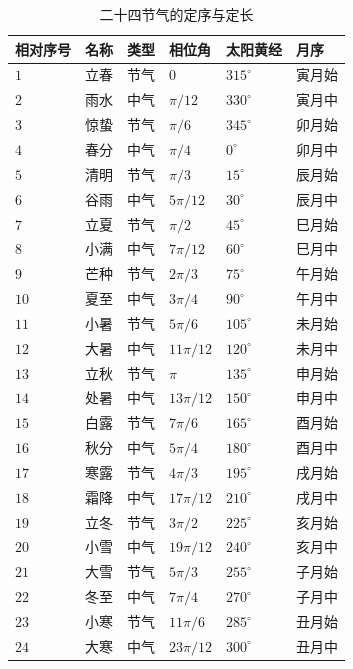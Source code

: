 \begin{table}[htbp]
    \centering
    \caption{二十四节气的定序与定长}
    \label{tab:jieqi_sequence}
    \begin{tabular}{>{\centering\arraybackslash}p{1.2cm}>{\centering\arraybackslash}p{1.5cm}>{\centering\arraybackslash}p{1.5cm}>{\centering\arraybackslash}p{1.8cm}>{\centering\arraybackslash}p{2cm}>{\centering\arraybackslash}p{2.5cm}}
        \toprule
        相对序号 & 名称 & 类型 & 相位角 & 太阳黄经 & 月序 \\
        \midrule
        \(1\) & 立春 & 节气 & \(0\) & \(315^\circ\) & 寅月始 \\
        \(2\) & 雨水 & 中气 & \(\pi/12\) & \(330^\circ\) & 寅月中 \\
        \(3\) & 惊蛰 & 节气 & \(\pi/6\) & \(345^\circ\) & 卯月始 \\
        \(4\) & 春分 & 中气 & \(\pi/4\) & \(0^\circ\) & 卯月中 \\
        \(5\) & 清明 & 节气 & \(\pi/3\) & \(15^\circ\) & 辰月始 \\
        \(6\) & 谷雨 & 中气 & \(5\pi/12\) & \(30^\circ\) & 辰月中 \\
        \(7\) & 立夏 & 节气 & \(\pi/2\) & \(45^\circ\) & 巳月始 \\
        \(8\) & 小满 & 中气 & \(7\pi/12\) & \(60^\circ\) & 巳月中 \\
        \(9\) & 芒种 & 节气 & \(2\pi/3\) & \(75^\circ\) & 午月始 \\
        \(10\) & 夏至 & 中气 & \(3\pi/4\) & \(90^\circ\) & 午月中 \\
        \(11\) & 小暑 & 节气 & \(5\pi/6\) & \(105^\circ\) & 未月始 \\
        \(12\) & 大暑 & 中气 & \(11\pi/12\) & \(120^\circ\) & 未月中 \\
        \(13\) & 立秋 & 节气 & \(\pi\) & \(135^\circ\) & 申月始 \\
        \(14\) & 处暑 & 中气 & \(13\pi/12\) & \(150^\circ\) & 申月中 \\
        \(15\) & 白露 & 节气 & \(7\pi/6\) & \(165^\circ\) & 酉月始 \\
        \(16\) & 秋分 & 中气 & \(5\pi/4\) & \(180^\circ\) & 酉月中 \\
        \(17\) & 寒露 & 节气 & \(4\pi/3\) & \(195^\circ\) & 戌月始 \\
        \(18\) & 霜降 & 中气 & \(17\pi/12\) & \(210^\circ\) & 戌月中 \\
        \(19\) & 立冬 & 节气 & \(3\pi/2\) & \(225^\circ\) & 亥月始 \\
        \(20\) & 小雪 & 中气 & \(19\pi/12\) & \(240^\circ\) & 亥月中 \\
        \(21\) & 大雪 & 节气 & \(5\pi/3\) & \(255^\circ\) & 子月始 \\
        \(22\) & 冬至 & 中气 & \(7\pi/4\) & \(270^\circ\) & 子月中 \\
        \(23\) & 小寒 & 节气 & \(11\pi/6\) & \(285^\circ\) & 丑月始 \\
        \(24\) & 大寒 & 中气 & \(23\pi/12\) & \(300^\circ\) & 丑月中 \\
        \bottomrule
    \end{tabular}
\end{table}

